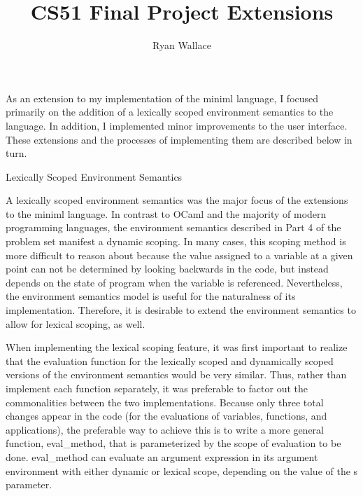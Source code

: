 \documentclass{article}
\begin{document}
\title{CS51 Final Project Extensions}

\author{Ryan Wallace}

\maketitle

As an extension to my implementation of the miniml language, I focused primarily on the addition of a lexically scoped environment semantics to the language. In addition, I implemented minor improvements to the user interface. These extensions and the processes of implementing them are described below in turn.

{\Large Lexically Scoped Environment Semantics \par}
A lexically scoped environment semantics was the major focus of the extensions to the miniml language. In contrast to OCaml and the majority of modern programming languages, the environment semantics described in Part 4 of the problem set manifest a dynamic scoping. In many cases, this scoping method is more difficult to reason about because the value assigned to a variable at a given point can not be determined by looking backwards in the code, but instead depends on the state of program when the variable is referenced. Nevertheless, the environment semantics model is useful for the naturalness of its implementation. Therefore, it is desirable to extend the environment semantics to allow for lexical scoping, as well.

When implementing the lexical scoping feature, it was first important to realize that the evaluation function for the lexically scoped and dynamically scoped versions of the environment semantics would be very similar. Thus, rather than implement each function separately, it was preferable to factor out the commonalities between the two implementations. Because only three total changes appear in the code (for the evaluations of variables, functions, and applications), the preferable way to achieve this is to write a more general function, eval\_method, that is parameterized by the scope of evaluation to be done. eval\_method can evaluate an argument expression in its argument environment with either dynamic or lexical scope, depending on the value of the s parameter. 
\end{document}
